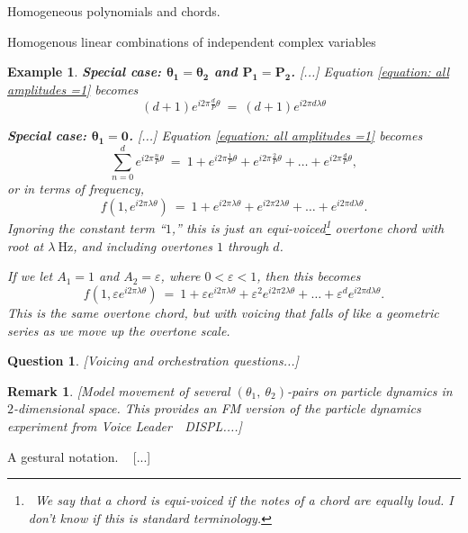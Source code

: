 \documentclass[letterpaper,11pt, reqno]{amsart}
\newtheorem{monodromy theorem}{Monodromy Theorem}[subsection]
\newtheorem{wild conjecture}[theorem]{Wild Conjecture}
\newtheorem{research objectives}{Research objectives}[subsection]
\newtheorem{question}[theorem]{Question}
\newtheorem{research question}[theorem]{Research questions}
\newtheorem{aside question}[theorem]{Aside question}
\newtheorem{example}[theorem]{Example}
\newtheorem{audio example}[theorem]{\loudspeaker[3] Example}
\newtheorem{blank remark}[theorem]{}
\newtheorem{terminology and comment}[theorem]{Terminology and comment}
\newtheorem{purity hypothesis}[theorem]{Purity hypothesis}
\newtheorem{corollary of the purity hypothesis}[theorem]{Corollary of the purity hypothesis}
\newtheorem{rem1}[theorem]{Remark}
\newenvironment{remark}{\begin{rem1}\em}{\end{rem1}}
\numberwithin{equation}{theorem}
\begin{document}
\begin{section}{Homogeneous polynomials and chords.}
\begin{subsection}{Homogenous linear combinations of independent complex variables}
\begin{example}
{\bf Special case: $\pmb{\theta_1=\theta_2}$ and $\pmb{P_1=P_2}$.}
{\color{red} [...]}
	Equation \eqref{equation: all amplitudes =1} becomes
	$$
	(d+1)e^{i2\pi\tfrac{d}{P}\theta}
	\ =\ 
	(d+1)e^{i2\pi d\lambda\theta}
	$$

{\bf Special case: $\pmb{\theta_1=0}$.}
{\color{red} [...]}
	Equation \eqref{equation: all amplitudes =1} becomes
	$$
	\sum_{n=0}^{d}e^{i2\pi\tfrac{n}{P}\theta}
	\ =\ 
	1
	+
	e^{i2\pi\tfrac{1}{P}\theta}
	+
	e^{i2\pi\tfrac{2}{P}\theta}
	+
	\dots
	+
	e^{i2\pi\tfrac{d}{P}\theta},
	$$
or in terms of frequency,
	$$
	f(1,e^{i2\pi\lambda\theta})
	\ =\ 
	1
	+
	e^{i2\pi \lambda\theta}
	+
	e^{i2\pi 2\lambda\theta}
	+
	\dots
	+
	e^{i2\pi d \lambda\theta}.
	$$
Ignoring the constant term ``$1$,'' this is just an equi-voiced\footnote{\ We say that a chord is {\em equi-voiced} if the notes of a chord are equally loud. I don't know if this is standard terminology.} overtone chord with root at $\lambda\ \text{Hz}$, and including overtones $1$ through $d$.

If we let $A_1=1$ and $A_2=\varepsilon$, where $0<\varepsilon <1$, then this becomes
	$$
	f(1,\varepsilon e^{i2\pi\lambda\theta})
	\ =\ 
	1
	+
	\varepsilon e^{i2\pi \lambda\theta}
	+
	\varepsilon^2 e^{i2\pi 2\lambda\theta}
	+
	\dots
	+
	\varepsilon^d e^{i2\pi d \lambda\theta}.
	$$
This is the same overtone chord, but with voicing that falls of like a geometric series as we move up the overtone scale.
\end{example}

\begin{question}
\normalfont
{\color{red} [Voicing and orchestration questions...]}
\end{question}


\begin{remark}
\normalfont
{\color{red} [Model movement of several $(\theta_1,\ \theta_2)$-pairs on particle dynamics in $2$-dimensional space. This provides an FM version of the particle dynamics experiment from {\em Voice Leader\ \textemdash\ DISPL.}...]}
\end{remark}
[...]
\end{subsection}

\begin{subsection}{A gestural notation.}
\ 
{\color{red} [...]}

\end{subsection}

\end{section}

\vskip 1cm
\end{document}
